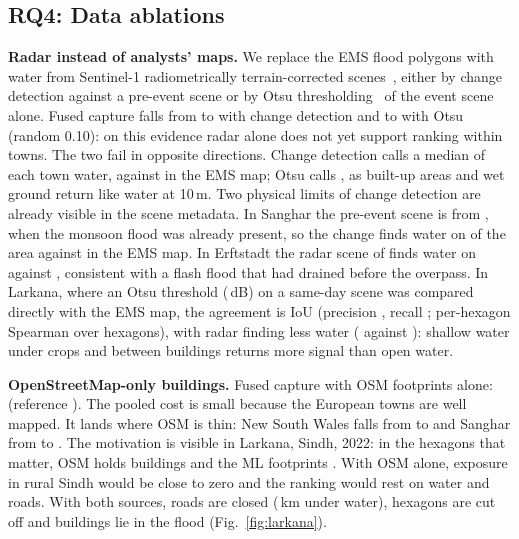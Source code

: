 \documentclass[conference]{IEEEtran}
\begin{document}
\begin{table}[t]
\caption{Leave one event out: rule fitted on the other five events (weights on $E,H,A$), scored on the held-out one.}
\label{tab:loeo}
\centering\scriptsize
\setlength{\tabcolsep}{3pt}

\end{table}

\subsection{RQ4: Data ablations}
\textbf{Radar instead of analysts' maps.} We replace the EMS flood polygons with water from Sentinel-1 radiometrically terrain-corrected scenes~\cite{pc_s1rtc}, either by change detection against a pre-event scene or by Otsu thresholding~\cite{otsu1979threshold} of the event scene alone. Fused capture falls from \ablChangeEHARef{} to \ablChangeEHA{} with change detection and to \ablOtsuEHA{} with Otsu (random 0.10): on this evidence radar alone does not yet support ranking within towns. The two fail in opposite directions. Change detection calls a median \waterMedChange{} of each town water, against \waterMedEMS{} in the EMS map; Otsu calls \waterMedOtsu{}, as built-up areas and wet ground return like water at 10\,m. Two physical limits of change detection are already visible in the scene metadata. In Sanghar the pre-event scene is from \radarSangharPre{}, when the monsoon flood was already present, so the change finds water on \radarSangharShare{} of the area against \emsSangharShare{} in the EMS map. In Erftstadt the radar scene of \radarErftstadtScene{} finds water on \radarErftstadtShare{} against \emsErftstadtShare{}, consistent with a flash flood that had drained before the overpass. In Larkana, where an Otsu threshold (\sOneThreshold{}\,dB) on a same-day scene was compared directly with the EMS map, the agreement is IoU \sOneIoU{} (precision \sOneP{}, recall \sOneR{}; per-hexagon Spearman \sOneSpearman{} over \sOneHexes{} hexagons), with radar finding less water (\sOneShareRadar{} against \sOneShareEMS{}): shallow water under crops and between buildings returns more signal than open water.

\textbf{OpenStreetMap-only buildings.} Fused capture with OSM footprints alone: \ablOSMOnlyEHA{} (reference \ablOSMOnlyEHARef{}). The pooled cost is small because the European towns are well mapped. It lands where OSM is thin: New South Wales falls from \osmOnlyNSWRef{} to \osmOnlyNSW{} and Sanghar from \osmOnlySangharRef{} to \osmOnlySanghar{}. The motivation is visible in Larkana, Sindh, 2022: in the \larkHexes{} hexagons that matter, OSM holds \larkOSM{} buildings and the ML footprints \larkMS{}. With OSM alone, exposure in rural Sindh would be close to zero and the ranking would rest on water and roads. With both sources, \larkClosed{} roads are closed (\larkUnderWater{}\,km under water), \larkCut{} hexagons are cut off and \larkBuildingsFlood{} buildings lie in the flood (Fig.~\ref{fig:larkana}).
\end{document}
